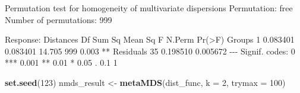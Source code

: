 \documentclass[
]{book}
\newenvironment{Shaded}{\begin{snugshade}}{\end{snugshade}}
\newcommand{\AttributeTok}[1]{\textcolor[rgb]{0.13,0.29,0.53}{#1}}
\newcommand{\DecValTok}[1]{\textcolor[rgb]{0.00,0.00,0.81}{#1}}
\newcommand{\FunctionTok}[1]{\textcolor[rgb]{0.13,0.29,0.53}{\textbf{#1}}}
\newcommand{\NormalTok}[1]{#1}
\newcommand{\OtherTok}[1]{\textcolor[rgb]{0.56,0.35,0.01}{#1}}
\newcommand{\SpecialCharTok}[1]{\textcolor[rgb]{0.81,0.36,0.00}{\textbf{#1}}}
\begin{document}
\begin{Shaded}
\end{Shaded}

\begin{Shaded}
\begin{Highlighting}[]

\NormalTok{Permutation test for homogeneity of multivariate dispersions}
\NormalTok{Permutation: free}
\NormalTok{Number of permutations: 999}

\NormalTok{Response: Distances}
\NormalTok{          Df   Sum Sq  Mean Sq      F N.Perm Pr(\textgreater{}F)   }
\NormalTok{Groups     1 0.083401 0.083401 14.705    999  0.003 **}
\NormalTok{Residuals 35 0.198510 0.005672                        }
\NormalTok{{-}{-}{-}}
\NormalTok{Signif. codes:  0 \textquotesingle{}***\textquotesingle{} 0.001 \textquotesingle{}**\textquotesingle{} 0.01 \textquotesingle{}*\textquotesingle{} 0.05 \textquotesingle{}.\textquotesingle{} 0.1 \textquotesingle{} \textquotesingle{} 1}
\end{Highlighting}
\end{Shaded}

\begin{Shaded}
\begin{Highlighting}[]
\FunctionTok{set.seed}\NormalTok{(}\DecValTok{123}\NormalTok{)}
\NormalTok{nmds\_result }\OtherTok{\textless{}{-}} \FunctionTok{metaMDS}\NormalTok{(dist\_func, }\AttributeTok{k =} \DecValTok{2}\NormalTok{, }\AttributeTok{trymax =} \DecValTok{100}\NormalTok{)}
\end{Highlighting}
\end{Shaded}
\end{document}
